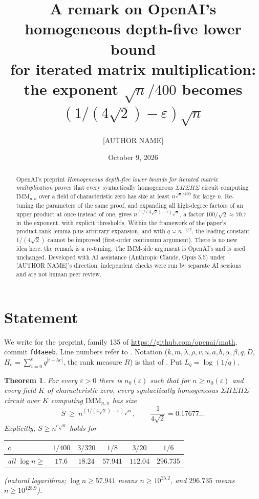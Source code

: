 \documentclass[10pt]{amsart}
\title[Depth-five IMM: exponent $1/(4\sqrt2)$]{A remark on OpenAI's homogeneous depth-five lower bound\\ for iterated matrix multiplication:
the exponent \texorpdfstring{$\sqrt n/400$ becomes $(1/(4\sqrt2)-\varepsilon)\sqrt n$}{sqrt(n)/400 becomes (1/(4 sqrt 2)-eps) sqrt(n)}}
\author{[AUTHOR NAME]}
\date{October 9, 2026}
\newtheorem{theorem}{Theorem}
\theoremstyle{remark}
\newcommand{\IMM}{\mathrm{IMM}}
\begin{document}
\begin{abstract}
OpenAI's preprint \emph{Homogeneous depth-five lower bounds for iterated matrix
multiplication} proves that every syntactically homogeneous
$\Sigma\Pi\Sigma\Pi\Sigma$ circuit computing $\IMM_{n,n}$ over a field of
characteristic zero has size at least $n^{\sqrt n/400}$ for large $n$. Re-tuning the
parameters of the same proof, and expanding all high-degree factors of an upper product
at once instead of one, gives $n^{(1/(4\sqrt2)-\varepsilon)\sqrt n}$, a factor
$100/\sqrt2\approx70.7$ in the exponent, with explicit thresholds. Within the
framework of the paper's product-rank lemma plus arbitrary expansion, and with
$q\asymp n^{-1/2}$, the leading constant $1/(4\sqrt2)$ cannot be improved (first-order
continuum argument). There is no new idea here: the remark is a re-tuning. The
IMM-side argument is OpenAI's and is used unchanged. Developed with AI assistance
(Anthropic Claude, Opus 5.5) under [AUTHOR NAME]'s direction; independent checks were
run by separate AI sessions and are not human peer review.
\end{abstract}
\maketitle

\section{Statement}
We write \cite{OAI135} for the preprint, family 135 of
\url{https://github.com/openai/math}, commit \texttt{fd4aeeb}. Line numbers refer to
. Notation ($k,m,\lambda,\rho,v,u,a,b,\alpha,\beta,q,D$,
$H_e=\sum_{i=0}^e q^{|i-\lambda e|}$, the rank measure $R$) is that of \cite[\S\S2--3]{OAI135}.
Put $L_q=\log(1/q)$.

\begin{theorem}\label{thm:main}
For every $\varepsilon>0$ there is $n_0(\varepsilon)$ such that for $n\ge n_0(\varepsilon)$ and every
field $K$ of characteristic zero, every syntactically homogeneous $\Sigma\Pi\Sigma\Pi\Sigma$
circuit over $K$ computing $\IMM_{n,n}$ has size
\[
S\ \ge\ n^{(1/(4\sqrt2)-\varepsilon)\sqrt n},\qquad \frac1{4\sqrt2}=0.17677\ldots
\]
Explicitly, $S\ge n^{c\sqrt n}$ holds for
\begin{center}
\begin{tabular}{lccccc}
\toprule
$c$ & $1/400$ & $3/320$ & $1/8$ & $3/20$ & $1/6$\\
\midrule
all $\log n\ge$ & $17.6$ & $18.24$ & $57.941$ & $112.04$ & $296.735$\\
\bottomrule
\end{tabular}
\end{center}
(natural logarithms; $\log n\ge 57.941$ means $n\ge 10^{25.2}$, and $296.735$ means $n\ge10^{128.9}$).
\end{theorem}
\end{document}
